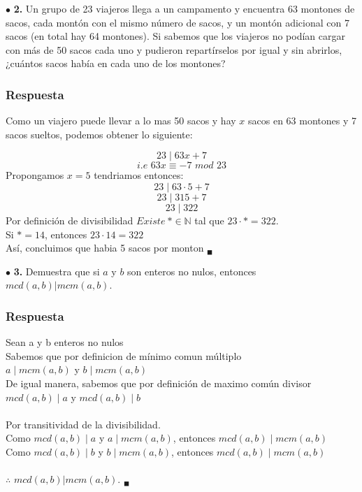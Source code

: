 \documentclass[12pt]{article}
\begin{document}
	\vspace{1cm}
	
	$\bullet$ \textbf{2.} Un grupo de 23 viajeros llega a un campamento y encuentra 63 montones de sacos, cada montón con el mismo número de sacos, y un montón adicional con 7 sacos (en total hay 64 montones). Si sabemos que los viajeros no podían cargar con más de 50 sacos cada uno y pudieron repartírselos por igual y sin abrirlos, ¿cuántos sacos había en cada uno de los montones?
	
	\subsubsection*{Respuesta}
	Como un viajero puede llevar a lo mas 50 sacos y hay $x$ sacos en 63 montones y 7 sacos 
	sueltos, podemos obtener lo siguiente:
	
	\[23 \mid 63x + 7\]
	\[\textit{i.e } 63x \equiv -7 \textit{ mod } 23\]
	Propongamos $x = 5$ tendriamos entonces:
	\[23 \mid 63 \cdot 5 + 7\]
	\[23 \mid 315 + 7\]
	\[23 \mid 322\]
	Por definición de divisibilidad $Existe \ \ast \in \mathbb{N}$ tal que $23 \cdot \ast = 322$.\\
	
	Si $\ast = 14$, entonces $23 \cdot 14 = 322$\\
	
	Así, concluimos que habia 5 sacos por monton $_\blacksquare$
	
	\vspace{1cm}
	
	$\bullet$ \textbf{3.} Demuestra que si $a$ y $b$ son enteros no nulos, entonces $mcd(a, b) |mcm(a, b)$.
	
	\subsubsection*{Respuesta}
	Sean a y b enteros no nulos\\
	Sabemos que por definicion de mínimo comun múltiplo\\
	$a \mid mcm(a,b)$ y $b \mid mcm(a,b)$\\
	De igual manera, sabemos que por definición de maximo común divisor\\
	$mcd(a,b) \mid a$ y $mcd(a,b) \mid b$\\
	\\
	Por transitividad de la divisibilidad.\\
	Como $mcd(a,b) \mid a$ y $a \mid mcm(a,b)$, entonces $mcd(a,b) \mid mcm(a,b)$\\
	Como $mcd(a,b) \mid b$ y $b \mid mcm(a,b)$, entonces $mcd(a,b) \mid mcm(a,b)$\\
	\\
	$\therefore$ $mcd(a, b) |mcm(a, b)$. $_\blacksquare$
	
\end{document}
